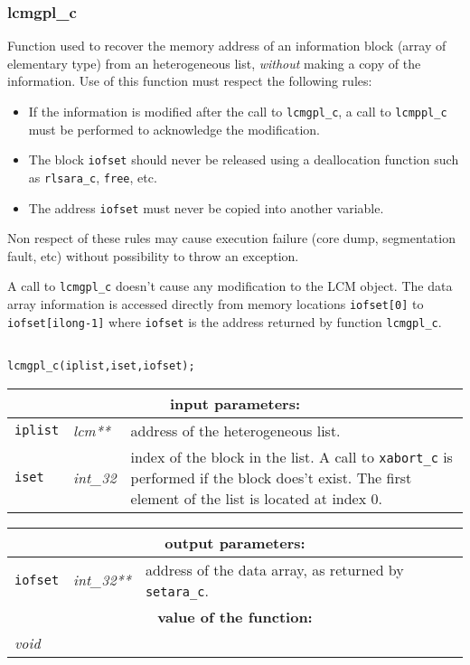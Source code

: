 \subsubsection{lcmgpl\_c}

Function used to recover the memory address of an information block (array of elementary type) from an heterogeneous list,
{\sl without} making a copy of the information. Use of this function must respect the following rules:
\begin{itemize}
\item If the information is modified after the call to {\tt lcmgpl\_c}, a call to {\tt lcmppl\_c} 
must be performed to acknowledge the modification.
\item The block {\tt *iofset} should never be released using a deallocation function such as
{\tt rlsara\_c}, {\tt free}, etc.
\item The address {\tt iofset} must never be copied into another variable.
\end{itemize}
Non respect of these rules may cause execution failure (core dump,
segmentation fault, etc) without possibility to throw an exception.

\vskip 0.2cm

A call to {\tt lcmgpl\_c} doesn't cause any modification to the LCM object.
The data array information is accessed directly from memory locations {\tt *iofset[0]} to {\tt *iofset[ilong-1]}
where {\tt iofset} is the address returned by function {\tt lcmgpl\_c}.

\begin{verbatim}

lcmgpl_c(iplist,iset,iofset);
\end{verbatim}

\noindent
\begin{tabular}{|p{1.5cm}|p{2cm}|p{11cm}|}
\hline
\multicolumn{3}{|c|}{\bf input parameters:} \\
\hline
{\tt iplist} & {\it lcm**} & address of the heterogeneous list. \\
\hline
{\tt iset} & {\it int\_32} & index of the block in the list.
A call to {\tt xabort\_c} is performed if the block does't exist.
The first element of the list is located at index $0$. \\
\hline
\end{tabular}

\vskip 0.8cm

\noindent
\begin{tabular}{|p{1.5cm}|p{2cm}|p{11cm}|}
\hline
\multicolumn{3}{|c|}{\bf output parameters:} \\
\hline
{\tt iofset} & {\it int\_32**} & address of the data array, as returned by {\tt setara\_c}. \\
\hline
\multicolumn{3}{|c|}{\bf value of the function:} \\
\hline
\multicolumn{2}{|l|}{\it void} &  \\
\hline
\end{tabular}

